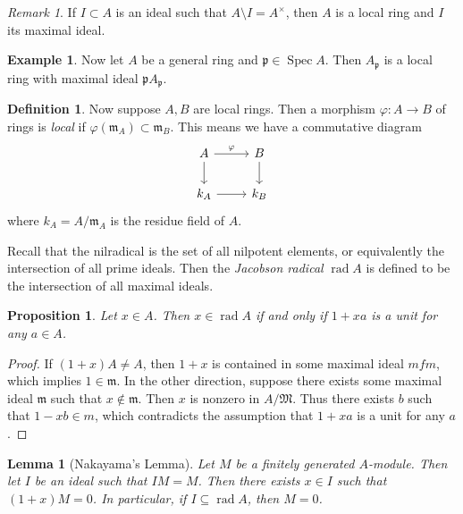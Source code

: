 \documentclass[leqno, openany]{memoir}
\newtheorem{prop}[thm]{Proposition}
\newtheorem{lem}[thm]{Lemma}
\theoremstyle{definition}
\newtheorem{defn}[thm]{Definition}
\newtheorem{exm}[thm]{Example}
\theoremstyle{remark}
\newtheorem{rmk}[thm]{Remark}
\theoremstyle{plain}
\theoremstyle{definition}
\theoremstyle{remark}
\newcommand{\mf}[1]{\mathfrak{#1}}
\DeclareMathOperator{\spec}{Spec}
\begin{document}
\begin{rmk}
    If $I \subset A$ is an ideal such that $A \setminus I = A^{\times}$, then $A$ is a local ring and $I$ its maximal ideal.
\end{rmk}

\begin{exm}
Now let $A$ be a general ring and $\mf{p} \in \spec A$. Then $A_{\mf{p}}$ is a local ring with maximal ideal $\mf{p} A_{\mf{p}}$.
\end{exm}

\begin{defn}
    Now suppose $A,B$ are local rings. Then a morphism $\varphi:A \to B$ of rings is \textit{local} if $\varphi(\mf{m}_A) \subset \mf{m}_B$. This means we have a commutative diagram
    \begin{equation}
    \begin{tikzcd}
        A \arrow{r}{\varphi} \arrow{d} & B \arrow{d} \\
        k_A \arrow{r} & k_B
    \end{tikzcd}
    \end{equation}
    where $k_A = A/ \mf{m}_A$ is the residue field of $A$.
\end{defn}

Recall that the nilradical is the set of all nilpotent elements, or equivalently the intersection of all prime ideals. Then the \textit{Jacobson radical} $\operatorname{rad} A$ is defined to be the intersection of all maximal ideals.

\begin{prop}
    Let $x \in A$. Then $x \in \operatorname{rad} A$ if and only if $1+xa$ is a unit for any $a \in A$.
\end{prop}

\begin{proof}
    If $(1+x)A \neq A$, then $1+x$ is contained in some maximal ideal $mf{m}$, which implies $1 \in \mf{m}$. In the other direction, suppose there exists some maximal ideal $\mf{m}$ such that $x \notin \mathfrak{m}$. Then $x$ is nonzero in $A/ \mathfrak{M}$. Thus there exists $b$ such that $1-xb \in m$, which contradicts the assumption that $1+xa$ is a unit for any $a$.
\end{proof}

\begin{lem}[Nakayama's Lemma]
    Let $M$ be a finitely generated $A$-module. Then let $I$ be an ideal such that $IM = M$. Then there exists $x \in I$ such that $(1+x) M = 0$. In particular, if $I \subseteq \operatorname{rad} A$, then $M = 0$.
\end{lem}
\end{document}
